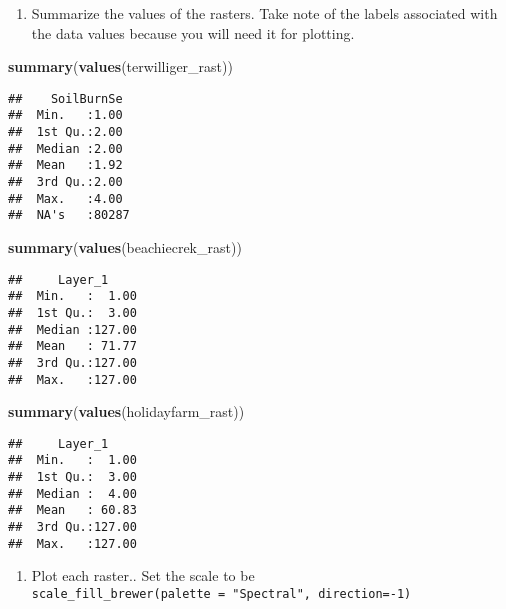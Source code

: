 \documentclass[
]{article}
\newenvironment{Shaded}{\begin{snugshade}}{\end{snugshade}}
\newcommand{\FunctionTok}[1]{\textcolor[rgb]{0.13,0.29,0.53}{\textbf{#1}}}
\newcommand{\NormalTok}[1]{#1}
\providecommand{\tightlist}{%
  \setlength{\itemsep}{0pt}\setlength{\parskip}{0pt}}
\begin{document}
\begin{enumerate}
\def\labelenumi{\alph{enumi}.}
\setcounter{enumi}{1}
\tightlist
\item
  Summarize the values of the rasters. Take note of the labels
  associated with the data values because you will need it for plotting.
\end{enumerate}

\begin{Shaded}
\begin{Highlighting}[]
\FunctionTok{summary}\NormalTok{(}\FunctionTok{values}\NormalTok{(terwilliger\_rast))}
\end{Highlighting}
\end{Shaded}

\begin{verbatim}
##    SoilBurnSe   
##  Min.   :1.00   
##  1st Qu.:2.00   
##  Median :2.00   
##  Mean   :1.92   
##  3rd Qu.:2.00   
##  Max.   :4.00   
##  NA's   :80287
\end{verbatim}

\begin{Shaded}
\begin{Highlighting}[]
\FunctionTok{summary}\NormalTok{(}\FunctionTok{values}\NormalTok{(beachiecrek\_rast))}
\end{Highlighting}
\end{Shaded}

\begin{verbatim}
##     Layer_1      
##  Min.   :  1.00  
##  1st Qu.:  3.00  
##  Median :127.00  
##  Mean   : 71.77  
##  3rd Qu.:127.00  
##  Max.   :127.00
\end{verbatim}

\begin{Shaded}
\begin{Highlighting}[]
\FunctionTok{summary}\NormalTok{(}\FunctionTok{values}\NormalTok{(holidayfarm\_rast))}
\end{Highlighting}
\end{Shaded}

\begin{verbatim}
##     Layer_1      
##  Min.   :  1.00  
##  1st Qu.:  3.00  
##  Median :  4.00  
##  Mean   : 60.83  
##  3rd Qu.:127.00  
##  Max.   :127.00
\end{verbatim}

\begin{enumerate}
\def\labelenumi{\alph{enumi}.}
\setcounter{enumi}{2}
\tightlist
\item
  Plot each raster.. Set the scale to be
  \texttt{scale\_fill\_brewer(palette\ =\ "Spectral",\ direction=-1)}
\end{enumerate}
\end{document}
